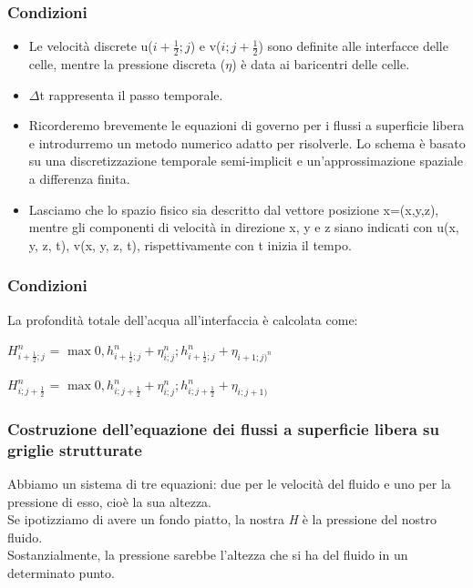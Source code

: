 \documentclass{beamer}
\begin{document}
	\begin{frame}
		
		\frametitle{Condizioni}
		
			\begin{itemize}
				\item Le velocità discrete u($i+\frac{1}{2} ; j $) e v($ i ; j+\frac{1}{2}$) sono definite alle interfacce delle celle, mentre la pressione discreta ($\eta$) è data ai baricentri delle celle.\\
				\item $\Delta$t rappresenta il passo temporale.
				\smallskip
				
				\item Ricorderemo brevemente le equazioni di governo per i flussi a superficie libera e introdurremo un metodo numerico adatto per risolverle. Lo schema è basato su una discretizzazione temporale semi-implicit e un'approssimazione spaziale a differenza finita.
				\item Lasciamo che lo spazio fisico sia descritto dal vettore posizione x=(x,y,z), mentre gli componenti di velocità in direzione x, y e z siano indicati con u(x, y, z, t), v(x, y, z, t), rispettivamente con t inizia il tempo.
			\end{itemize}
		
	\end{frame}
	
	
	\begin{frame}
		\frametitle{Condizioni}
			La profondità totale dell'acqua all'interfaccia è calcolata come: 
	
		\begin{center}
			$ H_{i+\frac{1}{2};j}^{n} $ = $  \max { 0, h_{i + \frac{1}{2}; j}^{n} + \eta_{i;j}^{n} ; h_{i+\frac{1}{2}; j}^{n} + \eta_{i+1;j)^{n} } } $
			
			$ H_{i; j+\frac{1}{2}}^{n} $ = $ \max { 0 , h_{i; j+\frac{1}{2}}^{n} + \eta_{i;j}^{n}; h_{i; j+\frac{1}{2}}^{n}+ \eta_{i; j+1)} } $
		\end{center}
	
			
	\end{frame}
	
	\begin{frame}
		\frametitle{Costruzione dell'equazione dei flussi a superficie libera su griglie strutturate }
			
			Abbiamo un sistema di tre equazioni: due per le velocità del fluido e uno per la pressione di esso, cioè la sua altezza. \\
			Se ipotizziamo di avere un fondo piatto, la nostra \emph{H} è la pressione del nostro fluido.\\
			Sostanzialmente, la pressione sarebbe l'altezza che si ha del fluido in un determinato punto.\\

	\end{frame}
\end{document}
